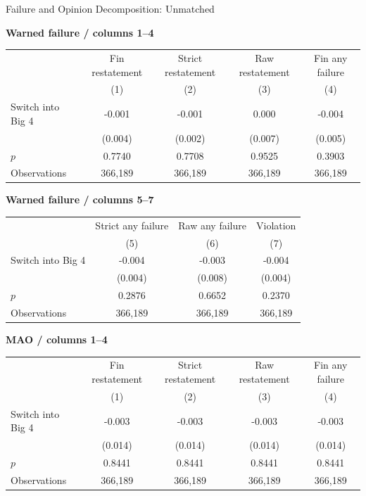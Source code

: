 \documentclass[10pt]{article}
\begin{document}
\fontsize{10}{12}\selectfont
\setlength{\tabcolsep}{3pt}\renewcommand{\arraystretch}{1.15}
\begin{center}\large Failure and Opinion Decomposition: Unmatched\end{center}
\medskip\textbf{Warned failure / columns 1--4}\par\smallskip
\begin{tabular*}{\textwidth}{@{\extracolsep{\fill}}lcccc@{}}
\toprule
 & Fin restatement & Strict restatement & Raw restatement & Fin any failure \\
 & (1) & (2) & (3) & (4) \\
\midrule
Switch into Big 4 & -0.001 & -0.001 & 0.000 & -0.004 \\
 & (0.004) & (0.002) & (0.007) & (0.005) \\
$p$ & 0.7740 & 0.7708 & 0.9525 & 0.3903 \\
Observations & 366,189 & 366,189 & 366,189 & 366,189 \\
\bottomrule\end{tabular*}\par
\medskip\textbf{Warned failure / columns 5--7}\par\smallskip
\begin{tabular*}{\textwidth}{@{\extracolsep{\fill}}lccc@{}}
\toprule
 & Strict any failure & Raw any failure & Violation \\
 & (5) & (6) & (7) \\
\midrule
Switch into Big 4 & -0.004 & -0.003 & -0.004 \\
 & (0.004) & (0.008) & (0.004) \\
$p$ & 0.2876 & 0.6652 & 0.2370 \\
Observations & 366,189 & 366,189 & 366,189 \\
\bottomrule\end{tabular*}\par
\medskip\textbf{MAO / columns 1--4}\par\smallskip
\begin{tabular*}{\textwidth}{@{\extracolsep{\fill}}lcccc@{}}
\toprule
 & Fin restatement & Strict restatement & Raw restatement & Fin any failure \\
 & (1) & (2) & (3) & (4) \\
\midrule
Switch into Big 4 & -0.003 & -0.003 & -0.003 & -0.003 \\
 & (0.014) & (0.014) & (0.014) & (0.014) \\
$p$ & 0.8441 & 0.8441 & 0.8441 & 0.8441 \\
Observations & 366,189 & 366,189 & 366,189 & 366,189 \\
\bottomrule\end{tabular*}\par
\end{document}

